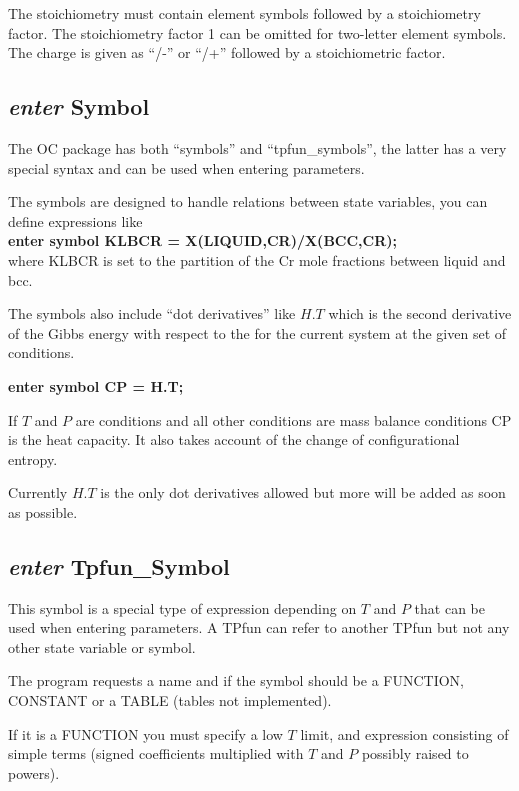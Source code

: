 \documentclass[11pt]{article}
\begin{document}
The stoichiometry must contain element symbols followed by a
stoichiometry factor.  The stoichiometry factor 1 can be omitted for
two-letter element symbols.  The charge is given as ``/-'' or ``/+''
followed by a stoichiometric factor.

\hypertarget{Enter symbol}{}
\subsection{{\em enter} Symbol}

The OC package has both ``symbols'' and ``tpfun\_symbols'', the latter
has a very special syntax and can be used when entering parameters.

The symbols are designed to handle relations between state variables,
you can define expressions like \\
{\bf enter symbol KLBCR = X(LIQUID,CR)/X(BCC,CR);}\\
where KLBCR is set to the partition of the Cr mole fractions between
liquid and bcc.

The symbols also include ``dot derivatives'' like $H.T$ which is the
second derivative of the Gibbs energy with respect to the for the
current system at the given set of conditions.

{\bf enter symbol CP = H.T;}

If $T$ and $P$ are conditions and all other conditions are mass
balance conditions CP is the heat capacity.  It also takes account of
the change of configurational entropy.

Currently $H.T$ is the only dot derivatives allowed but more will be
added as soon as possible.

\hypertarget{Enter TPfun}{}
\subsection{{\em enter} Tpfun\_Symbol}\label{sc:entertpf}

This symbol is a special type of expression depending on $T$ and $P$
that can be used when entering parameters.  A TPfun can refer to
another TPfun but not any other state variable or symbol.

The program requests a name and if the symbol should be a FUNCTION,
CONSTANT or a TABLE (tables not implemented).

If it is a FUNCTION you must specify a low $T$ limit, and expression
consisting of simple terms (signed coefficients multiplied with $T$
and $P$ possibly raised to powers).
\end{document}
